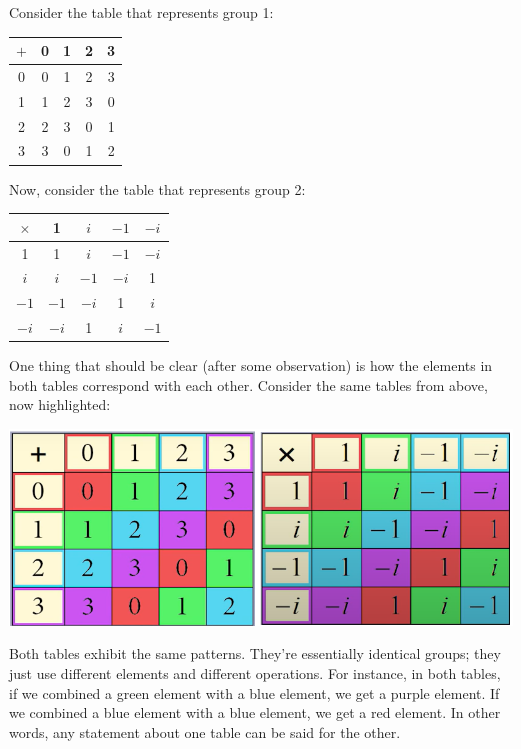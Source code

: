 \documentclass[letterpaper]{article}
\begin{document}
Consider the table that represents group 1:
\begin{center}
    \begin{tabular}{c|c c c c}
        $+$     & 0 & 1 & 2 & 3 \\ 
        \hline 
        0       & 0 & 1 & 2 & 3 \\
        1       & 1 & 2 & 3 & 0 \\ 
        2       & 2 & 3 & 0 & 1 \\ 
        3       & 3 & 0 & 1 & 2
    \end{tabular}
\end{center}
Now, consider the table that represents group 2: 
\begin{center}
    \begin{tabular}{c|c c c c}
        $\times$ & 1 & $i$ & $-1$ & $-i$ \\ 
        \hline 
        1        & 1 & $i$ & $-1$ & $-i$ \\ 
        $i$      & $i$ & $-1$ & $-i$ & 1 \\ 
        $-1$     & $-1$ & $-i$ & 1 & $i$ \\ 
        $-i$     & $-i$ & 1 & $i$ & $-1$
    \end{tabular}
\end{center}
One thing that should be clear (after some observation) is how the elements in both tables correspond with each other. Consider the same tables from above, now highlighted: 
\begin{center}
    \includegraphics[scale=0.5]{assets/homo_ex.png}
\end{center}
Both tables exhibit the same patterns. They're essentially identical groups; they just use different elements and different operations. For instance, in both tables, if we combined a green element with a blue element, we get a purple element. If we combined a blue element with a blue element, we get a red element. In other words, any statement about one table can be said for the other. 
\end{document}
